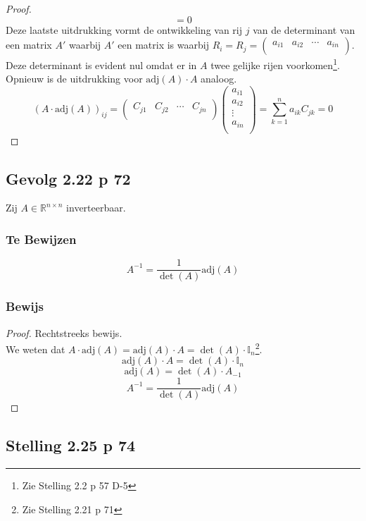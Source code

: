 \documentclass[lineaire_algebra_oplossingen.tex]{subfiles}
\begin{document}
\begin{proof}
\[=0
\]
Deze laatste uitdrukking vormt de ontwikkeling van rij $j$ van de determinant van een matrix $A'$ waarbij $A'$ een matrix is waarbij $R_i = R_j = \begin{pmatrix}a_{i1} & a_{i2}&\cdots&a_{in}\\\end{pmatrix}$. Deze determinant is evident nul omdat er in $A$ twee gelijke rijen voorkomen\footnote{Zie Stelling 2.2 p 57 D-5}.\\
Opnieuw is de uitdrukking voor $\text{adj}(A) \cdot A$ analoog.
\[
(A\cdot \text{adj}(A))_{ij} =
\begin{pmatrix}
C_{j1}&C_{j2}&\cdots&C_{jn}\\
\end{pmatrix}
\begin{pmatrix}
a_{i1}\\a_{i2}\\\vdots\\a_{in}\\
\end{pmatrix}
=
\sum_{k=1}^na_{ik}C_{jk}
=0
\]
\end{proof}


\subsection{Gevolg 2.22 p 72}
\label{2.22}
Zij $A \in \mathbb{R}^{n\times n}$ inverteerbaar.

\subsubsection*{Te Bewijzen}
\[
A^{-1} = \frac{1}{\det(A)}\text{adj}(A)
\]

\subsubsection*{Bewijs}
\begin{proof}
Rechtstreeks bewijs.\\
We weten dat $A\cdot \text{adj}(A) = \text{adj}(A) \cdot A = \det(A)\cdot\mathbb{I}_n$\footnote{Zie Stelling 2.21 p 71}.
\[
\text{adj}(A) \cdot A = \det(A)\cdot\mathbb{I}_n
\]
\[
\text{adj}(A) = \det(A) \cdot A_{-1}
\]
\[
A^{-1} = \frac{1}{\det(A)}\text{adj}(A)
\]
\end{proof}


\subsection{Stelling 2.25 p 74}
\label{2.25}
\end{document}
